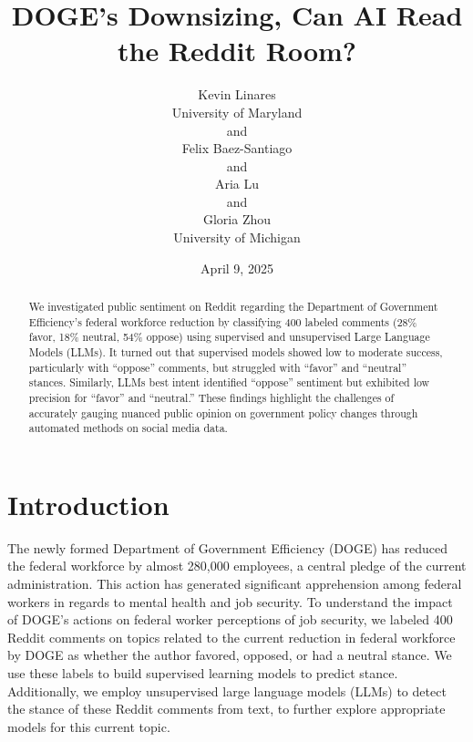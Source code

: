 \documentclass[
  12pt]{article}
\begin{document}
\def\spacingset#1{\renewcommand{\baselinestretch}%
{#1}\small\normalsize} \spacingset{1}



\date{April 9, 2025}
\title{\bf DOGE's Downsizing, Can AI Read the Reddit Room?}
\author{
Kevin Linares\\
University of Maryland\\
and\\Felix Baez-Santiago\\
and\\Aria Lu\\
and\\Gloria Zhou\\
University of Michigan\\
}
\maketitle

\bigskip
\bigskip
\begin{abstract}
We investigated public sentiment on Reddit regarding the Department of
Government Efficiency's federal workforce reduction by classifying 400
labeled comments (28\% favor, 18\% neutral, 54\% oppose) using
supervised and unsupervised Large Language Models (LLMs). It turned out
that supervised models showed low to moderate success, particularly with
``oppose'' comments, but struggled with ``favor'' and ``neutral''
stances. Similarly, LLMs best intent identified ``oppose'' sentiment but
exhibited low precision for ``favor'' and ``neutral.'' These findings
highlight the challenges of accurately gauging nuanced public opinion on
government policy changes through automated methods on social media
data.
\end{abstract}


\newpage
\spacingset{1.9} %


\section{Introduction}\label{sec-intro}

The newly formed Department of Government Efficiency (DOGE) has reduced
the federal workforce by almost 280,000 employees, a central pledge of
the current administration. This action has generated significant
apprehension among federal workers in regards to mental health and job
security. To understand the impact of DOGE's actions on federal worker
perceptions of job security, we labeled 400 Reddit comments on topics
related to the current reduction in federal workforce by DOGE as whether
the author favored, opposed, or had a neutral stance. We use these
labels to build supervised learning models to predict stance.
Additionally, we employ unsupervised large language models (LLMs) to
detect the stance of these Reddit comments from text, to further explore
appropriate models for this current topic.
\end{document}
